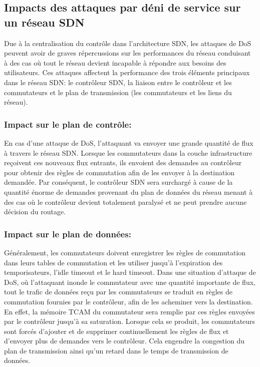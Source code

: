 \subsection{Impacts des attaques par déni de service sur un réseau SDN}
Due à la centralisation du contrôle dans l’architecture SDN, les attaques de DoS peuvent avoir de graves répercussions sur les performances du réseau conduisant à des cas où tout le réseau devient incapable à répondre aux besoins des utilisateurs. Ces attaques affectent la performance des trois éléments principaux dans le réseau SDN: le contrôleur SDN, la liaison entre le contrôleur et les commutateurs et le plan de transmission (les commutateurs et les liens du réseau).

\subsubsection{Impact sur le plan de contrôle:}
En cas d’une attaque de DoS, l’attaquant va envoyer une grande quantité de flux à travers le réseau SDN. Lorsque les commutateurs dans la couche infrastructure reçoivent ces nouveaux flux entrants, ils envoient des demandes au contrôleur pour obtenir des règles de commutation afin de les envoyer à la destination demandée. Par conséquent, le contrôleur SDN sera surchargé à cause de la quantité énorme de demandes provenant du plan de données du réseau menant à des cas où le contrôleur devient totalement paralysé et ne peut prendre aucune décision du routage.

\subsubsection{Impact sur le plan de données:}
Généralement, les commutateurs doivent enregistrer les règles de commutation dans leurs tables de commutation et les utiliser jusqu’à l’expiration des temporisateurs, l'idle timeout et le hard timeout. Dans une situation d’attaque de DoS, où l’attaquant inonde le commutateur avec une quantité importante de flux, tout le trafic de données reçu par les commutateurs se traduit en règles de commutation fournies par le contrôleur, afin de les acheminer vers la destination. En effet, la mémoire TCAM du commutateur sera remplie par ces règles envoyées par le contrôleur jusqu’à sa saturation. Lorsque cela se produit, les commutateurs sont forcés d’ajouter et de supprimer continuellement les règles de flux et d’envoyer plus de demandes vers le contrôleur. Cela engendre la congestion du plan de transmission ainsi qu’un retard dans le temps de transmission de données.

